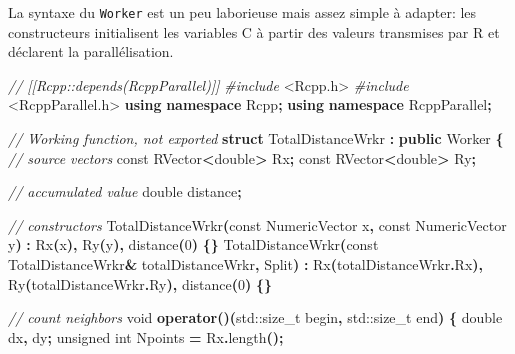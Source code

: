 \documentclass[
  12pt,
  french,
  a4paper,
  extrafontsizes,onecolumn,openright
  ]{memoir}
\newenvironment{Shaded}{\begin{snugshade}}{\end{snugshade}}
\newcommand{\AttributeTok}[1]{\textcolor[rgb]{0.13,0.29,0.53}{#1}}
\newcommand{\BuiltInTok}[1]{#1}
\newcommand{\CommentTok}[1]{\textcolor[rgb]{0.56,0.35,0.01}{\textit{#1}}}
\newcommand{\DataTypeTok}[1]{\textcolor[rgb]{0.13,0.29,0.53}{#1}}
\newcommand{\DecValTok}[1]{\textcolor[rgb]{0.00,0.00,0.81}{#1}}
\newcommand{\ImportTok}[1]{#1}
\newcommand{\KeywordTok}[1]{\textcolor[rgb]{0.13,0.29,0.53}{\textbf{#1}}}
\newcommand{\NormalTok}[1]{#1}
\newcommand{\OperatorTok}[1]{\textcolor[rgb]{0.81,0.36,0.00}{\textbf{#1}}}
\newcommand{\PreprocessorTok}[1]{\textcolor[rgb]{0.56,0.35,0.01}{\textit{#1}}}
\begin{document}
La syntaxe du \texttt{Worker} est un peu laborieuse mais assez simple à adapter: les constructeurs initialisent les variables C à partir des valeurs transmises par R et déclarent la parallélisation.

\scriptsize

\begin{Shaded}
\begin{Highlighting}[]
\CommentTok{// [[Rcpp::depends(RcppParallel)]]}
\PreprocessorTok{\#include }\ImportTok{\textless{}Rcpp.h\textgreater{}}
\PreprocessorTok{\#include }\ImportTok{\textless{}RcppParallel.h\textgreater{}}
\KeywordTok{using} \KeywordTok{namespace}\NormalTok{ Rcpp}\OperatorTok{;}
\KeywordTok{using} \KeywordTok{namespace}\NormalTok{ RcppParallel}\OperatorTok{;}

\CommentTok{// Working function, not exported}
\KeywordTok{struct}\NormalTok{ TotalDistanceWrkr }\OperatorTok{:} \KeywordTok{public}\NormalTok{ Worker}
\OperatorTok{\{}
  \CommentTok{// source vectors}
  \AttributeTok{const}\NormalTok{ RVector}\OperatorTok{\textless{}}\DataTypeTok{double}\OperatorTok{\textgreater{}}\NormalTok{ Rx}\OperatorTok{;}
  \AttributeTok{const}\NormalTok{ RVector}\OperatorTok{\textless{}}\DataTypeTok{double}\OperatorTok{\textgreater{}}\NormalTok{ Ry}\OperatorTok{;}
  
  \CommentTok{// accumulated value}
  \DataTypeTok{double}\NormalTok{ distance}\OperatorTok{;}
   
  \CommentTok{// constructors}
\NormalTok{  TotalDistanceWrkr}\OperatorTok{(}\AttributeTok{const}\NormalTok{ NumericVector x}\OperatorTok{,} \AttributeTok{const}\NormalTok{ NumericVector y}\OperatorTok{)} \OperatorTok{:}
\NormalTok{    Rx}\OperatorTok{(}\NormalTok{x}\OperatorTok{),}\NormalTok{ Ry}\OperatorTok{(}\NormalTok{y}\OperatorTok{),}\NormalTok{ distance}\OperatorTok{(}\DecValTok{0}\OperatorTok{)} \OperatorTok{\{\}}
\NormalTok{  TotalDistanceWrkr}\OperatorTok{(}\AttributeTok{const}\NormalTok{ TotalDistanceWrkr}\OperatorTok{\&}\NormalTok{ totalDistanceWrkr}\OperatorTok{,}\NormalTok{ Split}\OperatorTok{)} \OperatorTok{:}
\NormalTok{    Rx}\OperatorTok{(}\NormalTok{totalDistanceWrkr}\OperatorTok{.}\NormalTok{Rx}\OperatorTok{),}\NormalTok{ Ry}\OperatorTok{(}\NormalTok{totalDistanceWrkr}\OperatorTok{.}\NormalTok{Ry}\OperatorTok{),}\NormalTok{  distance}\OperatorTok{(}\DecValTok{0}\OperatorTok{)} \OperatorTok{\{\}}
  
  \CommentTok{// count neighbors}
  \DataTypeTok{void} \KeywordTok{operator}\OperatorTok{()(}\BuiltInTok{std::}\NormalTok{size\_t begin}\OperatorTok{,} \BuiltInTok{std::}\NormalTok{size\_t end}\OperatorTok{)} \OperatorTok{\{}
    \DataTypeTok{double}\NormalTok{ dx}\OperatorTok{,}\NormalTok{ dy}\OperatorTok{;}
    \DataTypeTok{unsigned} \DataTypeTok{int}\NormalTok{ Npoints }\OperatorTok{=}\NormalTok{ Rx}\OperatorTok{.}\NormalTok{length}\OperatorTok{();}


\end{Highlighting}
\end{Shaded}
\end{document}
